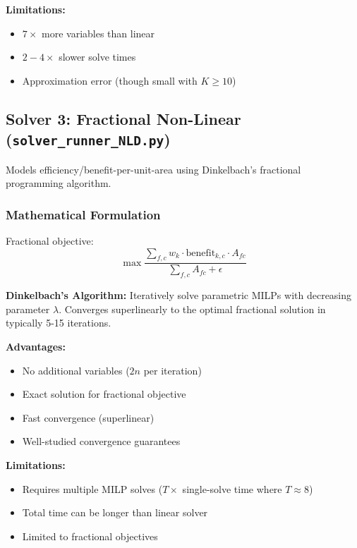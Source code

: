 \documentclass[11pt,a4paper]{article}
\begin{document}
\textbf{Limitations:}
\begin{itemize}
    \item $7\times$ more variables than linear
    \item $2-4\times$ slower solve times
    \item Approximation error (though small with $K \geq 10$)
\end{itemize}

\subsection{Solver 3: Fractional Non-Linear (\texttt{solver\_runner\_NLD.py})}

Models efficiency/benefit-per-unit-area using Dinkelbach's fractional programming algorithm.

\subsubsection{Mathematical Formulation}

Fractional objective:
\begin{equation}
\max \frac{\sum_{f,c} w_k \cdot \text{benefit}_{k,c} \cdot A_{fc}}{\sum_{f,c} A_{fc} + \epsilon}
\end{equation}

\textbf{Dinkelbach's Algorithm:}
Iteratively solve parametric MILPs with decreasing parameter $\lambda$. Converges superlinearly to the optimal fractional solution in typically 5-15 iterations.

\textbf{Advantages:}
\begin{itemize}
    \item No additional variables ($2n$ per iteration)
    \item Exact solution for fractional objective
    \item Fast convergence (superlinear)
    \item Well-studied convergence guarantees
\end{itemize}

\textbf{Limitations:}
\begin{itemize}
    \item Requires multiple MILP solves ($T \times$ single-solve time where $T \approx 8$)
    \item Total time can be longer than linear solver
    \item Limited to fractional objectives
\end{itemize}
\end{document}
